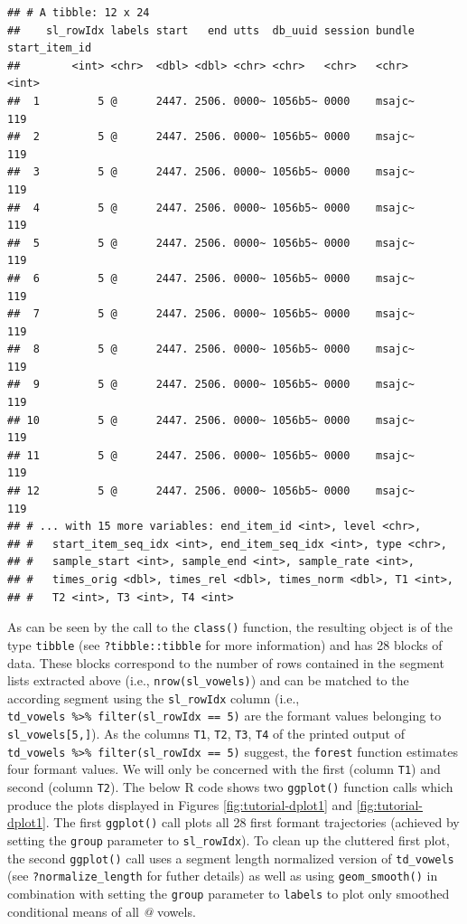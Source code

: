 \documentclass[]{book}
\begin{document}
\begin{verbatim}
## # A tibble: 12 x 24
##    sl_rowIdx labels start   end utts  db_uuid session bundle start_item_id
##        <int> <chr>  <dbl> <dbl> <chr> <chr>   <chr>   <chr>          <int>
##  1         5 @      2447. 2506. 0000~ 1056b5~ 0000    msajc~           119
##  2         5 @      2447. 2506. 0000~ 1056b5~ 0000    msajc~           119
##  3         5 @      2447. 2506. 0000~ 1056b5~ 0000    msajc~           119
##  4         5 @      2447. 2506. 0000~ 1056b5~ 0000    msajc~           119
##  5         5 @      2447. 2506. 0000~ 1056b5~ 0000    msajc~           119
##  6         5 @      2447. 2506. 0000~ 1056b5~ 0000    msajc~           119
##  7         5 @      2447. 2506. 0000~ 1056b5~ 0000    msajc~           119
##  8         5 @      2447. 2506. 0000~ 1056b5~ 0000    msajc~           119
##  9         5 @      2447. 2506. 0000~ 1056b5~ 0000    msajc~           119
## 10         5 @      2447. 2506. 0000~ 1056b5~ 0000    msajc~           119
## 11         5 @      2447. 2506. 0000~ 1056b5~ 0000    msajc~           119
## 12         5 @      2447. 2506. 0000~ 1056b5~ 0000    msajc~           119
## # ... with 15 more variables: end_item_id <int>, level <chr>,
## #   start_item_seq_idx <int>, end_item_seq_idx <int>, type <chr>,
## #   sample_start <int>, sample_end <int>, sample_rate <int>,
## #   times_orig <dbl>, times_rel <dbl>, times_norm <dbl>, T1 <int>,
## #   T2 <int>, T3 <int>, T4 <int>
\end{verbatim}

As can be seen by the call to the \texttt{class()} function, the resulting object is of the type \texttt{tibble} (see \texttt{?tibble::tibble} for more information) and has 28 blocks of data. These blocks correspond to the number of rows contained in the segment lists extracted above (i.e., \texttt{nrow(sl\_vowels)}) and can be matched to the according segment using the \texttt{sl\_rowIdx} column (i.e., \texttt{td\_vowels\ \%\textgreater{}\%\ filter(sl\_rowIdx\ ==\ 5)} are the formant values belonging to \texttt{sl\_vowels{[}5,{]}}). As the columns \texttt{T1}, \texttt{T2}, \texttt{T3}, \texttt{T4} of the printed output of \texttt{td\_vowels\ \%\textgreater{}\%\ filter(sl\_rowIdx\ ==\ 5)} suggest, the \texttt{forest} function estimates four formant values. We will only be concerned with the first (column \texttt{T1}) and second (column \texttt{T2}). The below R code shows two \texttt{ggplot()} function calls which produce the plots displayed in Figures \ref{fig:tutorial-dplot1} and \ref{fig:tutorial-dplot1}. The first \texttt{ggplot()} call plots all 28 first formant trajectories (achieved by setting the \texttt{group} parameter to \texttt{sl\_rowIdx}). To clean up the cluttered first plot, the second \texttt{ggplot()} call uses a segment length normalized version of \texttt{td\_vowels} (see \texttt{?normalize\_length} for futher details) as well as using \texttt{geom\_smooth()} in combination with setting the \texttt{group} parameter to \texttt{labels} to plot only smoothed conditional means of all \emph{@} vowels.
\end{document}
